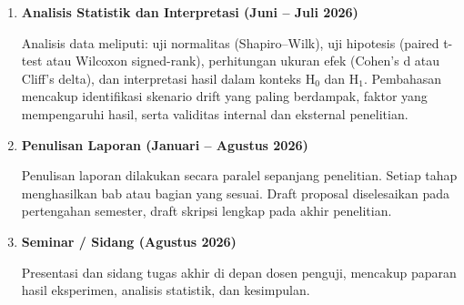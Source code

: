 \begin{enumerate}
    \item \textbf{Analisis Statistik dan Interpretasi (Juni -- Juli 2026)}
    
    Analisis data meliputi: uji normalitas (Shapiro--Wilk), uji hipotesis (paired t-test atau Wilcoxon signed-rank), perhitungan ukuran efek (Cohen's d atau Cliff's delta), dan interpretasi hasil dalam konteks H$_0$ dan H$_1$. Pembahasan mencakup identifikasi skenario drift yang paling berdampak, faktor yang mempengaruhi hasil, serta validitas internal dan eksternal penelitian.
    
    \item \textbf{Penulisan Laporan (Januari -- Agustus 2026)}
    
    Penulisan laporan dilakukan secara paralel sepanjang penelitian. Setiap tahap menghasilkan bab atau bagian yang sesuai. Draft proposal diselesaikan pada pertengahan semester, draft skripsi lengkap pada akhir penelitian.
    
    \item \textbf{Seminar / Sidang (Agustus 2026)}
    
    Presentasi dan sidang tugas akhir di depan dosen penguji, mencakup paparan hasil eksperimen, analisis statistik, dan kesimpulan.
\end{enumerate}
